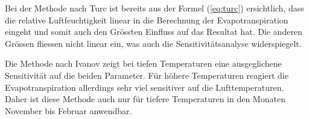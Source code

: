 Bei der Methode nach Turc ist bereits aus der Formel (\ref{eq:turc}) ersichtlich, dass die relative Luftfeuchtigkeit linear in die Berechnung der Evapotranspiration eingeht und somit auch den Grössten Einfluss auf das Resultat hat. Die anderen Grössen fliessen nicht linear ein, was auch die Sensitivitätsanalyse widerspiegelt.

Die Methode nach Ivanov zeigt bei tiefen Temperaturen eine ausgeglichene Sensitivität auf die beiden Parameter. Für höhere Temperaturen reagiert die Evapotranspiration allerdings sehr viel sensitiver auf die Lufttemperaturen. Daher ist diese Methode auch nur für tiefere Temperaturen in den Monaten November bis Februar anwendbar.